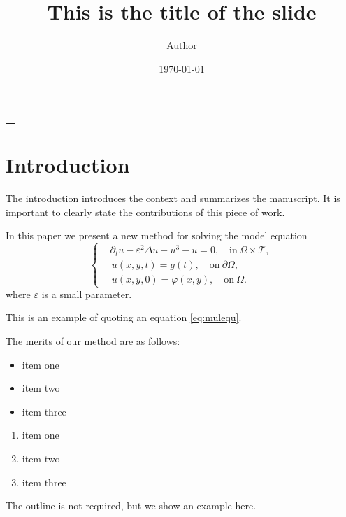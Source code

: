 \documentclass{article}
\title{This is the title of the slide}
\author{Author}
\date{\today}
\makeatletter
\theoremstyle{plain}
\theoremstyle{definition}
\theoremstyle{remark}
\numberwithin{equation}{section}
\numberwithin{figure}{section}
\numberwithin{table}{section}
\renewcommand*{\maketitle}{
  \begin{titlepage}
  \thispagestyle{plain}
  \setcounter{page}{0}
  \vspace*{4\baselineskip}
  \begin{center}
    {\bfseries\huge \@title}
  \end{center}
  \vspace*{1\baselineskip}
  \begin{center}
    \Large
    \begin{tabular}{c}
    \@author \\[10pt]
    \@date \\
    \end{tabular}
  \end{center}
  \vfill
\end{titlepage}
\restoregeometry
}
\makeatother
\begin{document}
\BgThispage

\maketitle

\clearpage


\tableofcontents

\clearpage


\section{Introduction}

The introduction introduces the context and summarizes the manuscript.
It is important to clearly state the contributions of this piece of work.

In this paper we present a new method for solving the model equation
\begin{equation}\label{eq:mulequ}
\left\{\begin{aligned}
  & \partial_{t} u-\varepsilon^{2} \Delta u+u^{3}-u=0, \quad \text{in} ~\Omega\times\mathcal{T}, \\
  &\, u(x,y,t) = g(t), \quad \text{on} ~ \partial \Omega, \\
  &\, u(x,y,0)=\varphi(x, y), \quad \text{on} ~\Omega.
\end{aligned}\right.
\end{equation}
where $\varepsilon$ is a small parameter.

This is an example of quoting an equation \eqref{eq:mulequ}.

The merits of our method are as follows:
\begin{itemize}
  \item item one
  \item item two
  \item item three
\end{itemize}
\begin{enumerate}
  \item item one
  \item item two
  \item item three
\end{enumerate}

The outline is not required, but we show an example here.
\end{document}
